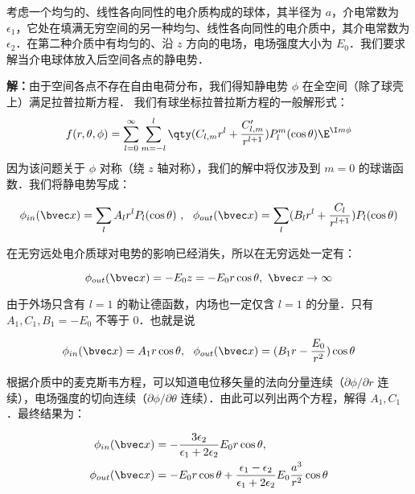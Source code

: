 \begin{example}{}
考虑一个均匀的、线性各向同性的电介质构成的球体，其半径为 $a$，介电常数为 $\epsilon_1$，它处在填满无穷空间的另一种均匀、线性各向同性的电介质中，其介电常数为 $\epsilon_2$．在第二种介质中有均匀的、沿 $z$ 方向的电场，电场强度大小为 $E_0$．我们要求解当介电球体放入后空间各点的静电势．

\textbf{解：}由于空间各点不存在自由电荷分布，我们得知静电势 $\phi$ 在全空间（除了球壳上）满足拉普拉斯方程．
我们有球坐标拉普拉斯方程的一般解形式：
\begin{equation}\label{EPoiEQ_eq2}
f(r, \theta, \phi) = \sum_{l = 0}^\infty \sum_{m = -l}^l \qty(C_{l,m} r^l + \frac{C'_{l,m}}{r^{l+1}})P_l^m(\cos\theta)\E^{\I m\phi}
\end{equation}
因为该问题关于 $\phi$ 对称（绕 $z$ 轴对称），我们的解中将仅涉及到 $m=0$ 的球谐函数．我们将静电势写成：

\begin{equation}
\phi_{in}(\bvec x)=\sum_{l}A_lr^lP_l(\cos \theta)\ ,\ \ \phi_{out}(\bvec x)=\sum_{l}(B_lr^l+\frac{C_l}{r^{l+1}})P_l(\cos \theta)
\end{equation}

在无穷远处电介质球对电势的影响已经消失，所以在无穷远处一定有：

\begin{equation}
\phi_{out}(\bvec x)=-E_0z=-E_0r\cos\theta,\ \bvec x\rightarrow \infty
\end{equation}

由于外场只含有 $l=1$ 的勒让德函数，内场也一定仅含 $l=1$ 的分量．只有 $A_1,C_1,B_1=-E_0$ 不等于 $0$．也就是说

\begin{equation}
\phi_{in}(\bvec x)=A_1r\cos \theta,\ \
\phi_{out}(\bvec x)=(B_1r-\frac{E_0}{r^{2}})\cos\theta
\end{equation}

根据介质中的麦克斯韦方程，可以知道电位移矢量的法向分量连续（$\partial\phi/\partial r$ 连续），电场强度的切向连续（$\partial\phi/\partial \theta$ 连续）．由此可以列出两个方程，解得 $A_1,C_1$．最终结果为：

\begin{align}
\phi_{in}(\bvec x)&=-\frac{3\epsilon_2}{\epsilon_1+2\epsilon_2}E_0r\cos\theta,\\
\phi_{out}(\bvec x)&=-E_0r\cos\theta+\frac{\epsilon_1-\epsilon_2}{\epsilon_1+2\epsilon_2}E_0\frac{a^3}{r^2}\cos\theta
\end{align}
\end{example}

